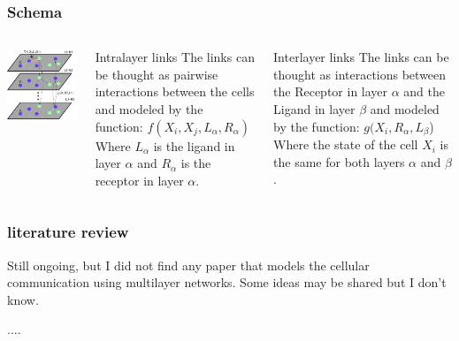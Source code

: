 \begin{frame}
    \frametitle{Schema}
    \normalsize  %
    \begin{columns}
            \includegraphics[width=\linewidth]{media/schema.png}

            \begin{block}{Intralayer links}
                The links can be thought as pairwise interactions between the cells and modeled by the function:
                $f(X_i,X_j,L_\alpha,R_\alpha)$
                Where $L_\alpha$ is the ligand in layer $\alpha$ and $R_\alpha$ is the receptor in layer $\alpha$.
            \end{block}
            \begin{block}{Interlayer links}
                The links can be thought as interactions between the Receptor in layer $\alpha$ and the Ligand in layer $\beta$ and modeled by the function:
                $g(X_i, R_\alpha, L_\beta$)
                Where the state of the cell $X_i$ is the same for both layers $\alpha$ and $\beta$.
            \end{block}
    \end{columns}
\end{frame}
\begin{frame}
    \frametitle{literature review}
    Still ongoing, but I did not find any paper that models the cellular communication using multilayer networks.
    Some ideas may be shared but I don't know.

    ....
\end{frame}
